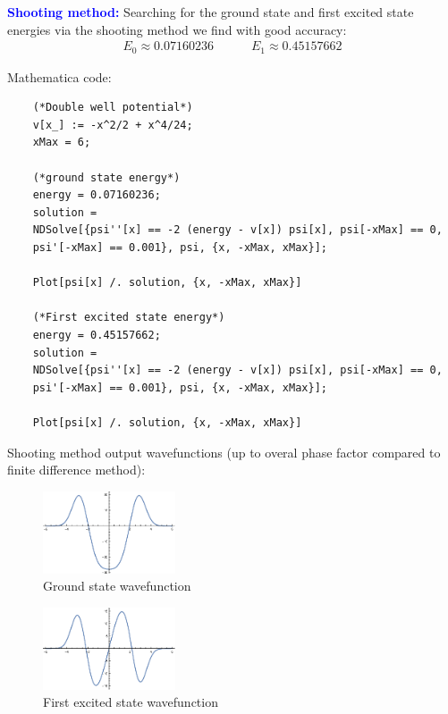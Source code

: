 \documentclass{article}
\theoremstyle{definition}
\begin{document}
\begin{enumerate}[label=(\alph*)]
	
	
	
	
	\textbf{\textcolor{blue}{Shooting method:}} Searching for the ground state and first excited state energies via the shooting method we find with good accuracy:
	\begin{align*}
	\boxed{E_0 \approx 0.07160236} \quad\quad\quad \boxed{E_1 \approx 0.45157662}
	\end{align*} 
	
	Mathematica code:
	\begin{lstlisting}
	(*Double well potential*)
	v[x_] := -x^2/2 + x^4/24;
	xMax = 6;
	
	(*ground state energy*)
	energy = 0.07160236;
	solution = 
	NDSolve[{psi''[x] == -2 (energy - v[x]) psi[x], psi[-xMax] == 0, 
	psi'[-xMax] == 0.001}, psi, {x, -xMax, xMax}];
	
	Plot[psi[x] /. solution, {x, -xMax, xMax}]
	
	(*First excited state energy*)
	energy = 0.45157662;
	solution = 
	NDSolve[{psi''[x] == -2 (energy - v[x]) psi[x], psi[-xMax] == 0, 
	psi'[-xMax] == 0.001}, psi, {x, -xMax, xMax}];
	
	Plot[psi[x] /. solution, {x, -xMax, xMax}]
	\end{lstlisting}
	
	Shooting method output wavefunctions (up to overal phase factor compared to finite difference method):
	
	\begin{figure}[!htb]
		\centering
		\includegraphics[width=0.35\textwidth]{problem3b1.eps}
		\caption{Ground state wavefunction}
	\end{figure}

	\begin{figure}[!htb]
		\centering
		\includegraphics[width=0.35\textwidth]{problem3b2.eps}
		\caption{First excited state wavefunction}
	\end{figure}
	

\end{enumerate}
\end{document}
